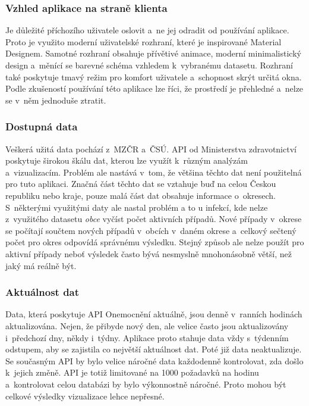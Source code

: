 \subsubsection*{Vzhled aplikace na straně klienta}

Je důležité příchozího uživatele oslovit a~ne jej odradit od používání aplikace. Proto je využito moderní uživatelské rozhraní, které je inspirované Material Designem. Samotné rozhraní obsahuje přívětivé animace, moderní minimalistický design a~měnící se barevné schéma vzhledem k~vybranému datasetu. Rozhraní také poskytuje tmavý režim pro komfort uživatele a~schopnost skrýt určitá okna. Podle zkušeností používání této aplikace lze říci, že prostředí je přehledné a~nelze se v~něm jednoduše ztratit.

\subsubsection*{Dostupná data}

Veškerá užitá data pochází z~MZČR a~ČSÚ. API od Ministerstva zdravotnictví poskytuje širokou škálu dat, kterou lze využít k~různým analýzám a~vizualizacím. Problém ale nastává v~tom, že většina těchto dat není použitelná pro tuto aplikaci. Značná část těchto dat se vztahuje buď na celou Českou republiku nebo kraje, pouze malá část dat obsahuje informace o~okresech. S~některými využitými daty ale nastal problém a to u infekcí, kde nelze z~využitého datasetu \emph{obce} vyčíst počet aktivních případů. Nové případy v~okrese se počítají součtem nových případů v~obcích v~daném okrese a~celkový sečtený počet pro okres odpovídá správnému výsledku. Stejný způsob ale nelze použít pro aktivní případy neboť výsledek často bývá nesmyslně mnohonásobně větší, než jaký má reálně být.

\subsubsection*{Aktuálnost dat}

Data, která poskytuje API Onemocnění aktuálně, jsou denně v~ranních hodinách aktualizována. Nejen, že přibyde nový den, ale velice často jsou aktualizovány i~předchozí dny, někdy i~týdny. Aplikace proto stahuje data vždy s~týdenním odstupem, aby se zajistila co největší aktuálnost dat. Poté již data neaktualizuje. Se současným API by bylo velice náročné data každodenně kontrolovat, zda došlo k~jejich změně. API je totiž limitované na 1000 požadavků na hodinu a~kontrolovat celou databázi by bylo výkonnostně náročné. Proto mohou být celkové výsledky vizualizace lehce nepřesné.

\endinput